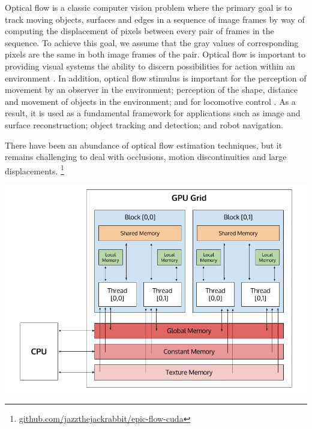 \documentclass[english]{article}
\begin{document}
	Optical flow is a classic computer vision problem where the primary goal is to track moving objects, surfaces and edges in a sequence of image frames by way of computing the displacement of pixels between every pair of frames in the sequence. To achieve this goal, we assume that the gray values of corresponding pixels are the same in both image frames of the pair. Optical flow is important to providing visual systems the ability to discern possibilities for action within an environment \cite{8}. In addition, optical flow stimulus is important for the perception of movement by an observer in the environment; perception of the shape, distance and movement of objects in the environment; and for locomotive control \cite{9}. As a result, it is used as a fundamental framework for applications such as image and surface reconstruction; object tracking and detection; and robot navigation.\newline

	There have been an abundance of optical flow estimation techniques, but it remains challenging to deal with occlusions, motion discontinuities and large displacements. \footnote{\href{https://github.com/jazzthejackrabbit/epic-flow-cuda}{github.com/jazzthejackrabbit/epic-flow-cuda}}\newline

	\begin{center}
	\includegraphics[width=160mm]{results/images/1_gpu_grid.png}
	\end{center}
\end{document}
